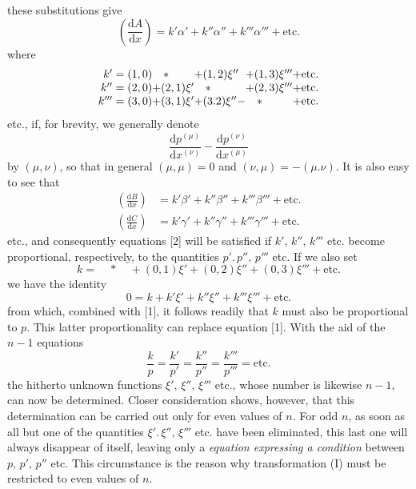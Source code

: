 these substitutions give
\[
\left(\frac{\mathrm{d}A}{\mathrm{d}x}\right)=k'\alpha'+k''\alpha''+k'''\alpha'''+\text{etc.}
\]
where
\[
\begin{array}{r@{}l@{}l@{}l@{}l@{}l}
k'={}&(1,0)&\quad *\quad&+(1,2)\xi''&+(1,3)\xi'''&+\text{etc.}\\
k''={}&(2,0)&+(2,1)\xi'&\quad *\quad&+(2,3)\xi'''&+\text{etc.}\\
k'''={}&(3,0)&+(3,1)\xi'&+(3.2)\xi''-&\quad *\quad&+\text{etc.}
\end{array}
\]
etc., if, for brevity, we generally denote
\[
\frac{\mathrm{d}p^{(\mu)}}{\mathrm{d}x^{(\nu)}}
-\frac{\mathrm{d}p^{(\nu)}}{\mathrm{d}x^{(\mu)}}
\]
by $(\mu,\nu)$, so that in general $(\mu,\mu)=0$ and $(\nu,\mu)=-(\mu.\nu)$.
It is also easy to see that
\[
\begin{aligned}
\left(\frac{\mathrm{d}B}{\mathrm{d}x}\right)&=k'\beta'+k''\beta''+k'''\beta'''+\text{etc.}\\
\left(\frac{\mathrm{d}C}{\mathrm{d}x}\right)&=k'\gamma'+k''\gamma''+k'''\gamma'''+\text{etc.}
\end{aligned}
\]
etc., and consequently equations [2] will be satisfied if \(k',\,k'',\,k'''\) etc. become proportional, respectively, to the quantities \(p'.\,p'',\,p'''\) etc. If we also set
\[
k=\quad *\quad +(0,1)\xi'+(0,2)\xi''+(0,3)\xi'''+\text{etc.}
\]
we have the identity
\[
0=k+k'\xi'+k''\xi''+k'''\xi'''+\text{etc.}
\]
from which, combined with [1], it follows readily that \(k\) must also be proportional to \(p\). This latter proportionality can replace equation [1]. With the aid of the \(n-1\) equations
\[
\frac{k}{p}=\frac{k'}{p'}=\frac{k''}{p''}=\frac{k'''}{p'''}=\text{etc.}
\]
the hitherto unknown functions \(\xi',\,\xi'',\,\xi'''\) etc., whose number is likewise \(n-1\), can now be determined. Closer consideration shows, however, that this determination can be carried out only for even values of \(n\). For odd \(n\), as soon as all but one of the quantities \(\xi'.\,\xi'',\,\xi'''\) etc. have been eliminated, this last one will always disappear of itself, leaving only a \emph{equation expressing a condition} between \(p,\,p',\,p''\) etc. This circumstance is the reason why transformation (I) must be restricted to even values of \(n\).

